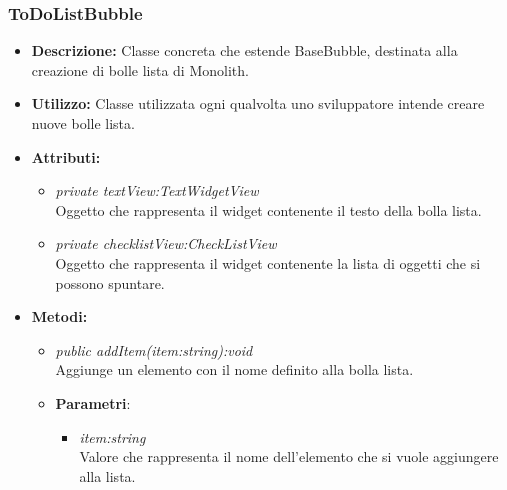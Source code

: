 \subsubsection{ToDoListBubble}
\begin{itemize}
\item \textbf{Descrizione:} Classe concreta che estende BaseBubble, destinata alla creazione di bolle lista di Monolith.
\item \textbf{Utilizzo:} Classe utilizzata ogni qualvolta uno sviluppatore intende creare nuove bolle lista.
\item \textbf{Attributi:}
\begin{itemize}
\item \textit{private textView:TextWidgetView}\\
Oggetto che rappresenta il widget contenente il testo della bolla lista.
\item \textit{private checklistView:CheckListView}\\
Oggetto che rappresenta il widget contenente la lista di oggetti che si possono spuntare.
\end{itemize}
\item \textbf{Metodi:}
\begin{itemize}
\item \textit{public addItem(item:string):void}\\
Aggiunge un elemento con il nome definito alla bolla lista.
\item{\textbf{Parametri}: \begin{itemize}
\item \textit{item:string}\\
Valore che rappresenta il nome dell'elemento che si vuole aggiungere alla lista.
\end{itemize}}
\end{itemize}
\end{itemize}

